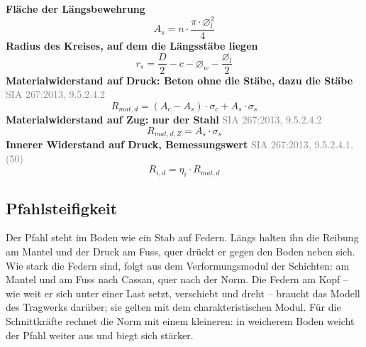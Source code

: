 \documentclass[11pt,a4paper]{article}
\newcommand{\normref}[1]{{\small\textcolor{gray}{#1}}}
\begin{document}
\noindent\textbf{Fläche der Längsbewehrung}
\begin{equation*}
A_s = n \cdot \frac{\pi \cdot \varnothing_l^{2}}{4}
\end{equation*}
\noindent\textbf{Radius des Kreises, auf dem die Längsstäbe liegen}
\begin{equation*}
r_s = \frac{D}{2} - c - \varnothing_w - \frac{\varnothing_l}{2}
\end{equation*}
\noindent\textbf{Materialwiderstand auf Druck: Beton ohne die Stäbe, dazu die Stäbe} \hfill \normref{SIA 267:2013, 9.5.2.4.2}
\begin{equation*}
R_{mat,d} = \left(A_c - A_s\right) \cdot \sigma_c + A_s \cdot \sigma_s
\end{equation*}
\noindent\textbf{Materialwiderstand auf Zug: nur der Stahl} \hfill \normref{SIA 267:2013, 9.5.2.4.2}
\begin{equation*}
R_{mat,d,Z} = A_s \cdot \sigma_s
\end{equation*}
\noindent\textbf{Innerer Widerstand auf Druck, Bemessungswert} \hfill \normref{SIA 267:2013, 9.5.2.4.1, (50)}
\begin{equation*}
R_{i,d} = \eta_i \cdot R_{mat,d}
\end{equation*}
\subsection{Pfahlsteifigkeit}
Der Pfahl steht im Boden wie ein Stab auf Federn. Längs halten ihn die Reibung am Mantel und der Druck am Fuss, quer drückt er gegen den Boden neben sich. Wie stark die Federn sind, folgt aus dem Verformungsmodul der Schichten: am Mantel und am Fuss nach Cassan, quer nach der Norm. Die Federn am Kopf – wie weit er sich unter einer Last setzt, verschiebt und dreht – braucht das Modell des Tragwerks darüber; sie gelten mit dem charakteristischen Modul. Für die Schnittkräfte rechnet die Norm mit einem kleineren: in weicherem Boden weicht der Pfahl weiter aus und biegt sich stärker.
\end{document}
